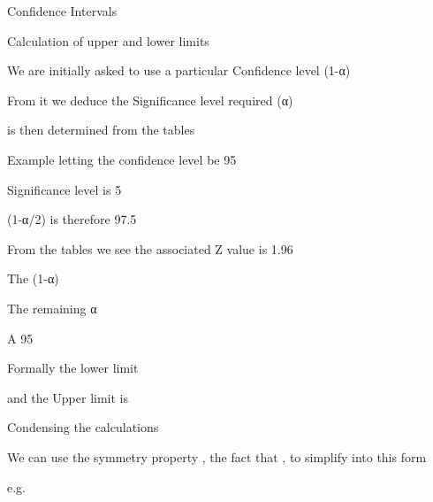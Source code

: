 
 

 

Confidence Intervals

Calculation of upper and lower limits 

We are initially asked to use a particular Confidence level (1-α)%

From it we deduce the Significance level required   (α)%

 is then determined from the tables

 

Example letting the confidence level be 95%

Significance level is 5%

 

(1-α/2) is therefore 97.5%

From the tables we see the associated Z value is 1.96

 

 

 

 

The (1-α)%

 

The remaining α%

 

A 95%

 

Formally the lower limit 

and the Upper limit is 

 

Condensing the calculations

 

We can use the symmetry property , the fact that , to simplify into this form 

 

e.g. 

 

